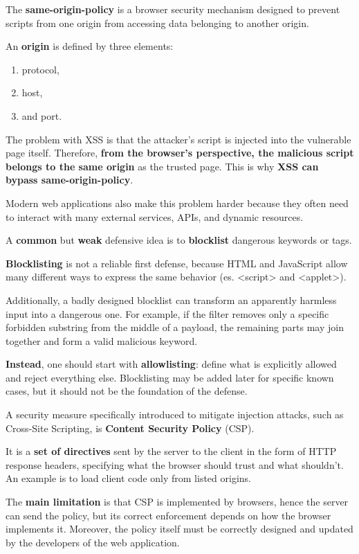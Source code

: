 \documentclass{article}
\begin{document}
The \textbf{same-origin-policy} is a browser security mechanism designed to prevent scripts from one origin from accessing data belonging to another origin.

An \textbf{origin} is defined by three elements:

\begin{enumerate}
    \item protocol,
    \item host,
    \item and port.
\end{enumerate}

The problem with XSS is that the attacker's script is injected into the vulnerable page itself. Therefore, \textbf{from the browser's perspective, the malicious script belongs to the same origin} as the trusted page. This is why \textbf{XSS can bypass same-origin-policy}.

Modern web applications also make this problem harder because they often need to interact with many external services, APIs, and dynamic resources.

A \textbf{common} but \textbf{weak} defensive idea is to \textbf{blocklist} dangerous keywords or tags.

\textbf{Blocklisting} is not a reliable first defense, because HTML and JavaScript allow many different ways to express the same behavior (es. \textless{}script\textgreater{} and \textless{}applet\textgreater{}).

Additionally, a badly designed blocklist can transform an apparently harmless input into a dangerous one. For example, if the filter removes only a specific forbidden substring from the middle of a payload, the remaining parts may join together and form a valid malicious keyword.

\textbf{Instead}, one should start with \textbf{allowlisting}: define what is explicitly allowed and reject everything else. Blocklisting may be added later for specific known cases, but it should not be the foundation of the defense.

A security measure specifically introduced to mitigate injection attacks, such as Cross-Site Scripting, is \textbf{Content Security Policy} (CSP).

It is a \textbf{set of directives} sent by the server to the client in the form of HTTP response headers, specifying what the browser should trust and what shouldn't. An example is to load client code only from listed origins.

The \textbf{main limitation} is that CSP is implemented by browsers, hence the server can send the policy, but its correct enforcement depends on how the browser implements it. Moreover, the policy itself must be correctly designed and updated by the developers of the web application.
\end{document}
